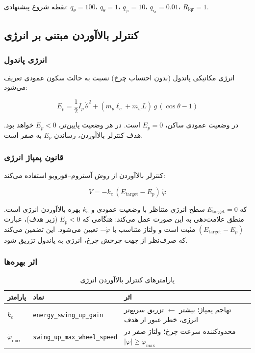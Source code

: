 نقطه شروع پیشنهادی: $q_\theta = 100$، $q_{\dot\theta} = 1$، $q_{\dot\varphi} = 10$، $q_{i_a} = 0.01$، $R_{\text{lqr}} = 1$.


\subsection{کنترلر بالاآوردن مبتنی بر انرژی}

\subsubsection{انرژی پاندول}

انرژی مکانیکی پاندول (بدون احتساب چرخ) نسبت به حالت سکون عمودی تعریف می‌شود:

\begin{equation}
E_p = \frac{1}{2}I_p\,\dot\theta^2 + (m_p\ell_c + m_w L)\,g\,(\cos\theta - 1)
\label{eq:pendulum-energy}
\end{equation}

در وضعیت عمودی ساکن، $E_p = 0$ است. در هر وضعیت پایین‌تر، $E_p < 0$ خواهد بود. هدف کنترلر بالاآوردن، رساندن $E_p$ به صفر است.

\subsubsection{قانون پمپاژ انرژی}

کنترلر بالاآوردن از روش آستروم–فوروبو استفاده می‌کند:

\begin{equation}
V = -k_e\,(E_{\text{target}} - E_p)\,\dot\varphi
\label{eq:energy-pump}
\end{equation}

که $E_{\text{target}} = 0$ سطح انرژی متناظر با وضعیت عمودی و $k_e$ بهره بالاآوردن انرژی است. منطق علامت‌دهی به این صورت عمل می‌کند: هنگامی که $E_p < 0$ (زیر هدف)، عبارت $(E_{\text{target}} - E_p)$ مثبت است و ولتاژ متناسب با $-\dot\varphi$ تعیین می‌شود. این تضمین می‌کند که صرف‌نظر از جهت چرخش چرخ، انرژی به پاندول تزریق شود.

\subsubsection{اثر بهره‌ها}

\begin{table}[H]
\centering
\caption{پارامترهای کنترلر بالاآوردن انرژی}
\label{tab:energy-gains}
\begin{tabular}{@{}lll@{}}
\toprule
پارامتر & نماد & اثر \\
\midrule
$k_e$ & \texttt{energy\_swing\_up\_gain} & تهاجم پمپاژ؛ بیشتر $\leftarrow$ تزریق سریع‌تر انرژی، خطر عبور از هدف \\
$\dot\varphi_{\max}$ & \texttt{swing\_up\_max\_wheel\_speed} & محدودکننده سرعت چرخ؛ ولتاژ صفر در $|\dot\varphi| \geq \dot\varphi_{\max}$ \\
\bottomrule
\end{tabular}
\end{table}

